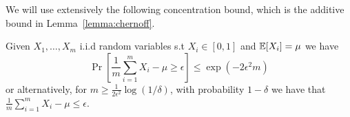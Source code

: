 



We will use extensively the following concentration bound, which is the additive bound in Lemma~\ref{lemma:chernoff}.

\begin{lemma}
\label{lem:hoeffding}
%
Given $X_{1},\dots,X_{m}$ i.i.d random
variables s.t $X_{i}\in[0,1]$ and $\mathbb{E}[X_{i}]=\mu$ we have
\[
\Pr\left[\frac{1}{m} \sum_{i=1}^{m}X_{i}-\mu \ge\epsilon\right] \le  \exp(-2\epsilon^{2}m)
\]
or alternatively, for $m\geq \frac{1}{2\epsilon^2}\log(1/\delta)$, with probability $1-\delta$ we have that $\frac{1}{m} \sum_{i=1}^{m}X_{i}-\mu \le\epsilon$.
\end{lemma}


